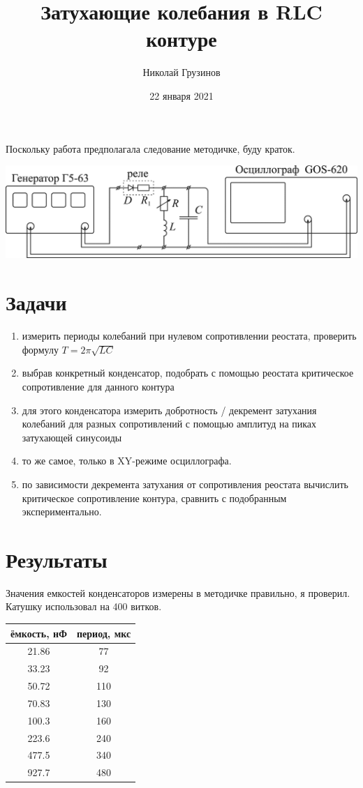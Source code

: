 \documentclass[a4paper, 12pt]{article}
\title{Затухающие колебания в RLC контуре}
\author{Николай Грузинов}
\date{22 января 2021}
\begin{document}
\maketitle

Поскольку работа предполагала следование методичке, буду краток.
\begin{center}
\includegraphics[width=0.7\linewidth]{curcuit.png}
\end{center}

\section{Задачи}
\begin{enumerate}
\item измерить периоды колебаний при нулевом сопротивлении реостата, проверить формулу $T = 2 \pi \sqrt{LC}$
\item выбрав конкретный конденсатор, подобрать с помощью реостата критическое сопротивление для данного контура
\item для этого конденсатора измерить добротность / декремент затухания колебаний для разных сопротивлений с помощью амплитуд на пиках затухающей синусоиды
\item то же самое, только в XY-режиме осциллографа.
\item по зависимости декремента затухания от сопротивления реостата вычислить критическое сопротивление контура, сравнить с подобранным экспериментально.
\end{enumerate}

\section{Результаты}
Значения емкостей конденсаторов измерены в методичке правильно, я проверил.
Катушку использовал на 400 витков.

\begin{tabular}{|c|c|}        \hline
ёмкость, нФ & период, мкс  \\ \hline
21.86       & 77           \\ \hline
33.23       & 92           \\ \hline
50.72       & 110          \\ \hline
70.83       & 130          \\ \hline
100.3       & 160          \\ \hline
223.6       & 240          \\ \hline
477.5       & 340          \\ \hline
927.7       & 480          \\ \hline
\end{tabular}
\end{document}

